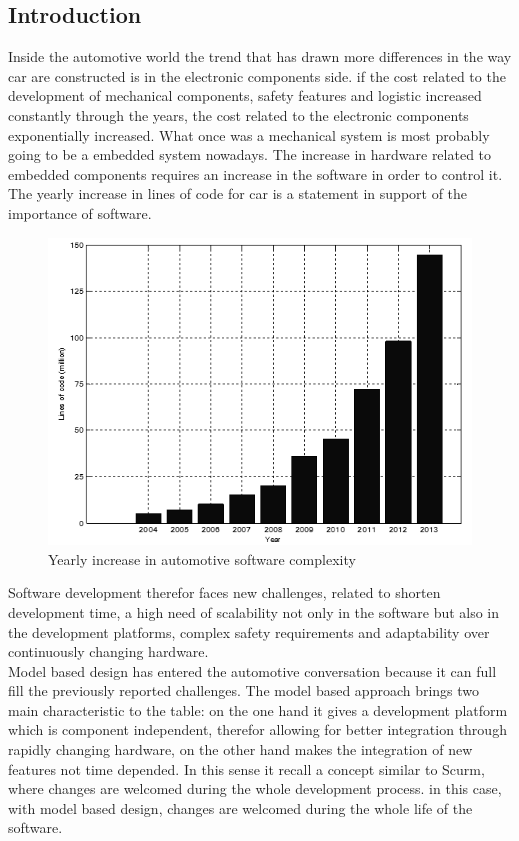 \documentclass[../main.tex]{subfiles}
\begin{document}
\subsection{Introduction}
Inside the automotive world the trend that has drawn more differences in the way car are constructed is in the electronic components side. if the cost related to the development of mechanical components, safety features and logistic increased constantly through the years, the cost related to the electronic components exponentially increased. What once was a mechanical system is most probably going to be a embedded system nowadays. The increase in hardware related to embedded components requires an increase in the software in order to control it. The yearly increase in lines of code for car is a statement in support of the importance of software. 
\begin{figure}[H]
    \centering
    \includegraphics[width=\linewidth]{images_folder/Yearly-increase-in-automotive-software-complexity-shown-by-million-lines-of-code-of-1-ConvertImage.png}
    \caption{Yearly increase in automotive software complexity}
    \label{fig:yearlyincreas}
\end{figure}
Software development therefor faces new challenges, related to shorten development time, a high need of scalability  not only in the software but also in the development platforms, complex safety requirements and adaptability over continuously changing hardware.\\
Model based design has entered the automotive conversation because it can full fill the previously reported challenges. The model based approach brings two main characteristic to the table: on the one hand it gives a development platform which is component independent, therefor allowing for better integration through rapidly changing hardware, on the other hand makes the integration of new features not time depended. In this sense it recall a concept similar to Scurm, where changes are welcomed during the whole development process. in this case, with model based design, changes are welcomed during the whole life of the software.
\end{document}
